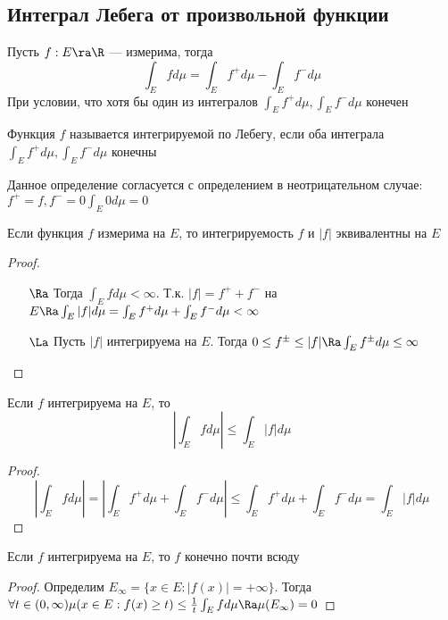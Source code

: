 
\subsection{Интеграл Лебега от произвольной функции}

\begin{definition}
    Пусть \(f: E \ra \R\) --- измерима, тогда
    \[\int_E f d \mu = \int_E f^+ d \mu - \int_E f^- d\mu\]
    При условии, что хотя бы один из интегралов \(\int_E f^+ d \mu, \int_E f^- d\mu\) конечен
\end{definition}

\begin{definition}
    Функция \(f\) называется интегрируемой по Лебегу, если оба интеграла \(\int_E f^+ d \mu, \int_E f^- d\mu\) конечны 
\end{definition}

\begin{note}
    Данное определение согласуется с определением в неотрицательном случае: \(f^+ = f, f^- = 0 \int_E 0 d \mu = 0\)
\end{note}

\begin{note}
    Если функция \(f\) измерима на \(E\), то интегрируемость \(f\) и \(|f|\) эквивалентны на \(E\)
\end{note}
\begin{proof}\indent
    \begin{enumerate}
        \item[\(\Ra\)] Тогда \(\int_E f d \mu < \infty\). Т.к. \(|f| = f^+ + f^-\) на \(E \Ra \int_E|f|d\mu = \int_E f^+ d \mu + \int_E f^- d \mu < \infty\)
        \item[\(\La\)] Пусть \(|f|\) интегрируема на \(E\). Тогда \(0 \le f^\pm \le |f| \Ra \int_E f^\pm d \mu \le \infty\)
    \end{enumerate}
\end{proof}

\begin{note}
    Если \(f\) интегрируема на \(E\), то
    \[\left|\int_E f d \mu\right| \le \int_E |f|d \mu\]
\end{note}
\begin{proof}
    \[\left|\int_E f d \mu\right| = \left|\int_E f^+ d \mu + \int_E f^- d \mu\right| \le \int_E f^+ d \mu + \int_E f^- d \mu = \int_E |f| d \mu\]
\end{proof}

\begin{note}
    Если \(f\) интегрируема на \(E\), то \(f\) конечно почти всюду
\end{note}
\begin{proof}
    Определим \(E_\infty = \{x \in E: |f(x)| = +\infty\}\). Тогда \(\forall t \in (0, \infty) \mu(x \in E: f(x) \ge t) \le \frac{1}{t}\int_E f d \mu \Ra \mu(E_\infty) = 0\)
\end{proof}

